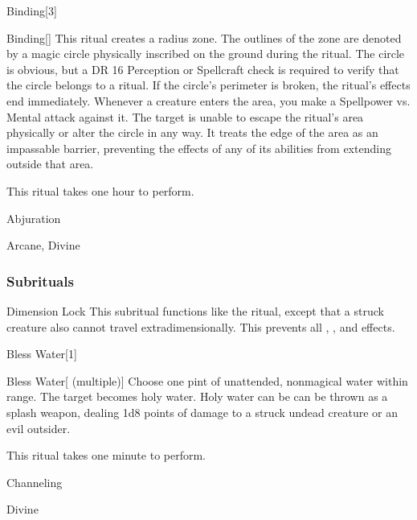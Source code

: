 \begin{spellsection}{Binding}[3]


\begin{ability}{Binding}[]
This ritual creates a \areasmall radius zone.
The outlines of the zone are denoted by a magic circle physically inscribed on the ground during the ritual.
The circle is obvious, but a DR 16 Perception or Spellcraft check is required to verify that the circle belongs to a  ritual.
If the circle's perimeter is broken, the ritual's effects end immediately.
Whenever a creature enters the area, you make a Spellpower vs. Mental attack against it.
\hit The target is unable to escape the ritual's area physically or alter the circle in any way.
It treats the edge of the area as an impassable barrier, preventing the effects of any of its abilities from extending outside that area.

This ritual takes one hour to perform.
\end{ability}




 Abjuration

 Arcane, Divine
\end{spellsection}


\subsubsection{Subrituals}


\begin{ability}[\nth{5}]{Dimension Lock}
This subritual functions like the  ritual, except that a struck creature also cannot travel extradimensionally.
This prevents all , , and  effects.
\end{ability}
\vspace{0.25em}


\begin{spellsection}{Bless Water}[1]


\begin{ability}{Bless Water}[ (multiple)]
Choose one pint of unattended, nonmagical water within \rngclose range.
The target becomes holy water.
Holy water can be can be thrown as a splash weapon, dealing 1d8 points of damage to a struck undead creature or an evil outsider.

This ritual takes one minute to perform.
\end{ability}




 Channeling

 Divine
\end{spellsection}


